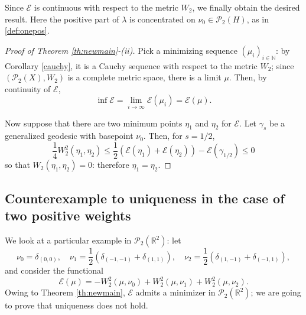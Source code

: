 \documentclass[12pt,a4paper]{article}
\renewcommand{\P}{\mathcal{P}}
\newcommand{\X}{\mathcal{P}_2(H)}
\theoremstyle{plain}
\theoremstyle{definition}
\begin{document}
Since $\mathscr{E}$ is continuous with respect to the metric $W_2$, we finally obtain the desired result. Here the positive part of $\lambda$ is concentrated on $\nu_0\in\X$, as in \eqref{def:onepos}.

\begin{proof}[Proof of Theorem \ref{th:newmain}-(ii)]
    Pick a minimizing sequence $(\mu_i)_{i \in \mathbb{N}}$: by Corollary \ref{cauchy}, it is a Cauchy sequence with respect to the metric $W_2$; since $(\P_2(X), W_2)$ is a complete metric space, there is a limit $\mu$. Then, by continuity of $\mathscr{E}$, 
    $$\inf \mathscr{E} = \lim_{i\to \infty} \mathscr{E}(\mu_i) = \mathscr{E}(\mu).$$ 
    
    Now suppose that there are two minimum points $\eta_1$ and $\eta_2$ for $\mathscr{E}$. Let $\gamma_s$ be a generalized geodesic with basepoint $\nu_0$. Then, for $s=1/2$,
    $$
    \frac{1}{4} W_2^2(\eta_1,\eta_2)\leq \frac{1}{2} (\mathscr{E}(\eta_1) + \mathscr{E}(\eta_2)) -\mathscr{E}(\gamma_{1/2}) \leq 0
    $$
    so that $W_2(\eta_1,\eta_2) = 0$: therefore $\eta_1 = \eta_2$.
\end{proof}




\subsection{Counterexample to uniqueness in the case of two positive weights}
\label{ssec:example}
We look at a particular example in $\P_2(\mathbb{R}^2)$: let 
\[
    \nu_0 = \delta_{(0,0)},\quad \nu_1 = \frac12 (\delta_{(-1,-1)} + \delta_{(1,1)}), \quad \nu_2 = \frac12 (\delta_{(1,-1)} + \delta_{(-1,1)}),
\]
and consider the functional
$$
\mathscr{E}(\mu) = - W_2^2(\mu, \nu_0) + W_2^2(\mu,\nu_1) + W_2^2(\mu,\nu_2).
$$
Owing to Theorem \ref{th:newmain}, $\mathscr E$ admits a minimizer in $\P_2(\mathbb{R}^2)$; we are going to prove that uniqueness does not hold. 
\end{document}
